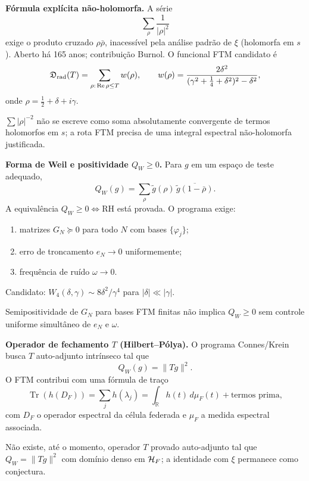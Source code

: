 \documentclass[11pt,a4paper]{article}
\begin{document}
\begin{programs}

\item \textbf{Fórmula explícita não-holomorfa.}
A série
\[
  \sum_\rho \frac{1}{|\rho|^2}
\]
exige o produto cruzado $\rho\bar\rho$, inacessível pela análise padrão
de $\xi$ (holomorfa em $s$). Aberto há 165 anos; contribuição Burnol.
O funcional FTM candidato é
\[
  \mathfrak{D}_{\mathrm{rad}}(T) = \sum_{\rho:\,\operatorname{Re}\rho\le T} w(\rho),
  \qquad w(\rho)=\frac{2\delta^2}{(\gamma^2+\tfrac14+\delta^2)^2-\delta^2},
\]
onde $\rho=\tfrac12+\delta+i\gamma$.

\begin{gap}
$\sum|\rho|^{-2}$ não se escreve como soma absolutamente convergente
de termos holomorfos em $s$; a rota FTM precisa de uma integral
espectral não-holomorfa justificada. \OPEN
\end{gap}

\item \textbf{Forma de Weil e positividade $Q_W\ge0$.}
Para $g$ em um espaço de teste adequado,
\[
  Q_W(g)=\sum_\rho \tilde g(\rho)\,\overline{\tilde g(1-\bar\rho)}.
\]
A equivalência $Q_W\ge0\Leftrightarrow\mathrm{RH}$ está provada.
O programa exige:
\begin{enumerate}[label=(\roman*),leftmargin=2em]
  \item matrizes $G_N\succeq0$ para todo $N$ com bases $\{\varphi_j\}$;
  \item erro de troncamento $e_N\to0$ uniformemente;
  \item frequência de ruído $\omega\to0$.
\end{enumerate}
Candidato: $W_4(\delta,\gamma)\sim 8\delta^2/\gamma^4$ para $|\delta|\ll|\gamma|$.

\begin{gap}
Semipositividade de $G_N$ para bases FTM finitas não implica
$Q_W\ge0$ sem controle uniforme simultâneo de $e_N$ e $\omega$. \OPEN
\end{gap}

\item \textbf{Operador de fechamento $T$ (Hilbert–Pólya).}
O programa Connes/Krein busca $T$ auto-adjunto intrínseco tal que
\[
  Q_W(g) = \|Tg\|^2.
\]
O FTM contribui com uma fórmula de traço
\[
  \operatorname{Tr}(h(D_F))
  =\sum_j h(\lambda_j)
  =\int_{\mathbb R} h(t)\,d\mu_F(t)+\text{termos prima},
\]
com $D_F$ o operador espectral da célula federada e
$\mu_F$ a medida espectral associada.

\begin{gap}
Não existe, até o momento, operador $T$ provado auto-adjunto tal que
$Q_W=\|Tg\|^2$ com domínio denso em $\mathcal{H}_F$;
a identidade com $\xi$ permanece como conjectura. \OPEN
\end{gap}


\end{programs}
\end{document}
